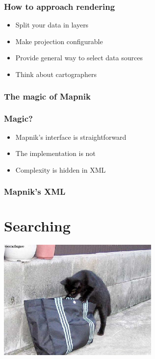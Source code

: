 \documentclass[14pt]{beamer}
\begin{document}
\begin{frame}
  \frametitle{How to approach rendering}
  \begin{itemize}
  \item Split your data in layers
  \item Make projection configurable
  \item Provide general way to select data sources
  \item Think about cartographers
  \end{itemize}
\end{frame}

\begin{frame}
  \frametitle{The magic of Mapnik}
  
\end{frame}

\begin{frame}
  \frametitle{Magic?}
  \begin{itemize}
  \item Mapnik's interface is straightforward
  \item The implementation is not
  \item Complexity is hidden in XML
  \end{itemize}
\end{frame}

\begin{frame}
  \frametitle{Mapnik's XML}
\end{frame}


\section{Searching}

\begin{frame}[fragile]
  \begin{center}
    \includegraphics[width=300px]{geocoding.jpg}
  \end{center}
\end{frame}
\end{document}
